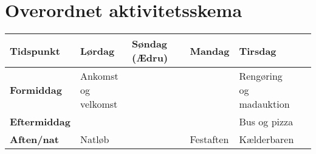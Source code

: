 \section{Overordnet aktivitetsskema}

\begin{center}
\begin{tabular}{|p{2.2cm}|p{2.5cm}|p{2.5cm}|p{2.5cm}|p{2.5cm}|p{2.5cm}|}
\hline
\textbf{Tidspunkt}  & \textbf{Lørdag}       & \textbf{Søndag (Ædru)}    & \textbf{Mandag}   & \textbf{Tirsdag}  \\ \hline
\textbf{Formiddag}  & \makecell{Ankomst \\og velkomst}  &  &            & \makecell{Rengøring \\og madauktion}  \\ \hline 
\textbf{Eftermiddag}&                                   &  &            & Bus og pizza                          \\ \hline 
\textbf{Aften/nat}  & Natløb                            &  & Festaften  & Kælderbaren                           \\ \hline
\end{tabular}
\end{center}